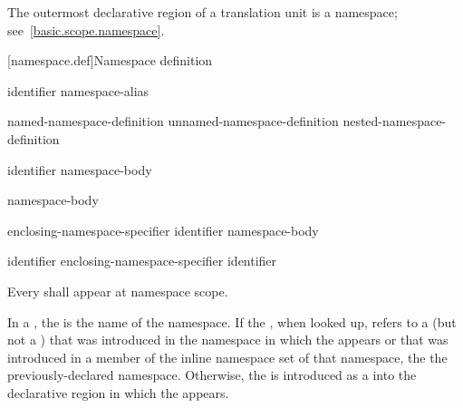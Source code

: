 \pnum
The outermost declarative region of a translation unit is a namespace;
see~\ref{basic.scope.namespace}.

[namespace.def]{Namespace definition}%
%

\begin{bnf}
\br
        identifier\br
        namespace-alias
\end{bnf}

\begin{bnf}
\br
        named-namespace-definition\br
        unnamed-namespace-definition\br
        nested-namespace-definition
\end{bnf}

\begin{bnf}
\br
           identifier \terminal{\{} namespace-body \terminal{\}}
\end{bnf}

\begin{bnf}
\br
           \terminal{\{} namespace-body \terminal{\}}
\end{bnf}

\begin{bnf}
\br
         enclosing-namespace-specifier \terminal{::}  identifier \terminal{\{} namespace-body \terminal{\}}
\end{bnf}

\begin{bnf}
\br
        identifier\br
        enclosing-namespace-specifier \terminal{::}  identifier
\end{bnf}

\begin{bnf}
\br
\end{bnf}

\pnum
Every  shall appear at namespace scope.

\pnum
In a ,
the  is the name of the namespace.
If the , when looked up,
refers to a  (but not a )
that was introduced in the namespace
in which the  appears
or that was introduced in a member of the inline namespace set of that namespace,
the 
 the previously-declared namespace.
Otherwise, the  is introduced
as a  into the declarative region
in which the  appears.

